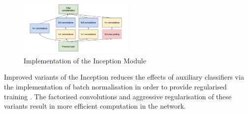 \documentclass[conference]{IEEEtran}
\begin{document}
\begin{figure} [h] %
  \centering
    \includegraphics[width=0.5\textwidth]{graphs/GoogLeNet} 
    \caption{Implementation of the Inception Module \cite{Szegedy2015}}
    \label{fig: GoogLeNet}
\end{figure}

Improved variants of the Inception reduces the effects of auxiliary classifiers via the implementation of batch normalisation in order to provide regularised training \cite{Szegedy2015a}. The factorised convolutions and aggressive regularisation of these variants result in more efficient computation in the network.




\end{document}
